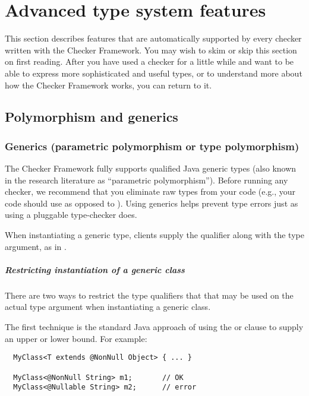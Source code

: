 \htmlhr
\chapter{Advanced type system features\label{advanced-type-system-features}}

This section describes features that are automatically supported by every
checker written with the Checker Framework.
You may wish to skim or skip this section on first reading.  After you have
used a checker for a little while and want to be able to express more
sophisticated and useful types, or to understand more about how the Checker
Framework works, you can return to it.


\section{Polymorphism and generics\label{polymorphism}}

\subsection{Generics (parametric polymorphism or type polymorphism)\label{generics}}

The Checker Framework fully supports
qualified Java generic types (also known in the research literature as ``parametric
polymorphism'').  Before running any checker, we recommend that you eliminate
raw types from your code (e.g., your code should use  as
opposed to ).
Using generics helps prevent type errors just as using a pluggable
type-checker does.

When instantiating a generic type,
clients supply the qualifier along with the type argument, as in
.


\paragraph{Restricting instantiation of a generic class}

There are two ways to restrict the type qualifiers that that may be used on
the actual type argument when instantiating a generic class.

The first technique is the standard Java approach of using the
 or  clause to supply an upper or lower bound.
For example:

\begin{Verbatim}
  MyClass<T extends @NonNull Object> { ... }

  MyClass<@NonNull String> m1;       // OK
  MyClass<@Nullable String> m2;      // error
\end{Verbatim}

